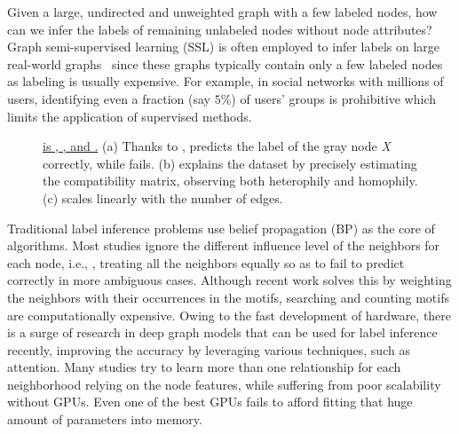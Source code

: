 

Given a large, undirected and unweighted graph with a few labeled nodes, how can we infer the labels of remaining unlabeled nodes without node attributes? Graph semi-supervised learning (SSL) is often employed to infer labels on large real-world graphs~\cite{talukdar2009new, kipf2016semi, belkin2004regularization, abu2019mixhop} since these graphs typically contain only a few labeled nodes as labeling is usually expensive. For example, in social networks with millions of users, identifying even a fraction (say $5\%$) of users' groups is prohibitive which limits the application of supervised methods. 

\begin{figure*}[]
\centering
{}
{}
{}
\caption{\label{fig:crown} \underline{\method is \effect, \explain \xspace , and \scale.} (a) Thanks to \ndiff, \method predicts the label of the gray node \textit{X} correctly, while \linbp fails. (b) \method explains the dataset by precisely estimating the compatibility matrix, observing both heterophily and homophily. (c) \method scales linearly with the number of edges.}
\end{figure*}

Traditional label inference problems use belief propagation (BP) as the core of algorithms. Most studies ignore the different influence level of the neighbors for each node, i.e., \ndiff, treating all the neighbors equally so as to fail to predict correctly in more ambiguous cases. Although recent work \cite{eswaran2020higher} solves this by weighting the neighbors with their occurrences in the motifs, searching and counting motifs are computationally expensive.
Owing to the fast development of hardware, there is a surge of research in deep graph models that can be used for label inference recently, improving the accuracy by leveraging various techniques, such as attention.
Many studies \cite{velivckovic2017graph, brody2021attentive} try to learn more than one relationship for each neighborhood relying on the node features, while suffering from poor scalability without GPUs. Even one of the best GPUs fails to afford fitting that huge amount of parameters into memory.

